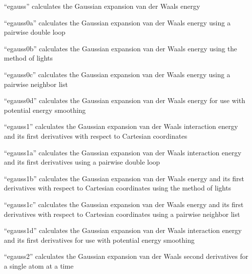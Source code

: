 \documentclass[letterpaper,11pt,english]{sphinxmanual}
\begin{document}
“egauss” calculates the Gaussian expansion van der Waals energy


“egauss0a” calculates the Gaussian expansion van der Waals
energy using a pairwise double loop


“egauss0b” calculates the Gaussian expansion van der Waals energy
using the method of lights


“egauss0c” calculates the Gaussian expansion van der Waals
energy using a pairwise neighbor list


“egauss0d” calculates the Gaussian expansion van der Waals
energy for use with potential energy smoothing


“egauss1” calculates the Gaussian expansion van der Waals
interaction energy and its first derivatives with respect
to Cartesian coordinates


“egauss1a” calculates the Gaussian expansion van der Waals
interaction energy and its first derivatives using a pairwise
double loop


“egauss1b” calculates the Gaussian expansion van der Waals
energy and its first derivatives with respect to Cartesian
coordinates using the method of lights


“egauss1c” calculates the Gaussian expansion van der Waals
energy and its first derivatives with respect to Cartesian
coordinates using a pairwise neighbor list


“egauss1d” calculates the Gaussian expansion van der Waals
interaction energy and its first derivatives for use with
potential energy smoothing


“egauss2” calculates the Gaussian expansion van der Waals
second derivatives for a single atom at a time

\end{document}
